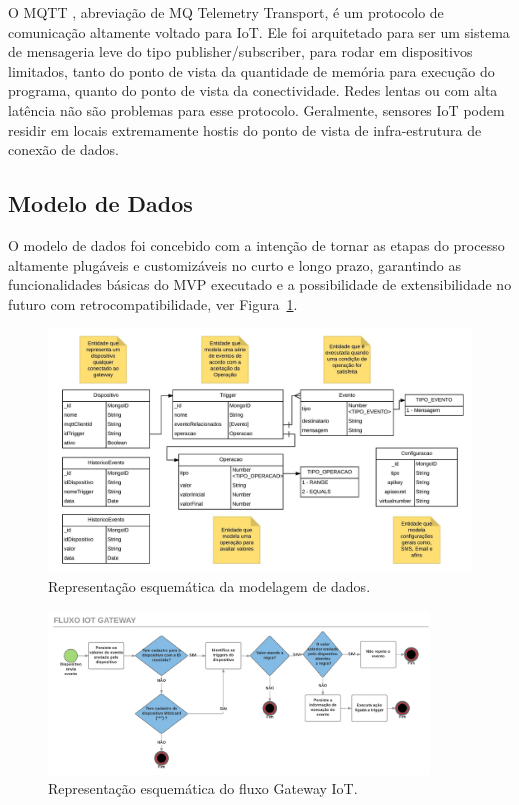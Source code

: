 O MQTT \cite{Mqtt}, abreviação de MQ Telemetry Transport, é um protocolo de comunicação altamente voltado para IoT. Ele foi arquitetado para ser um sistema de mensageria leve do tipo publisher/subscriber, para rodar em dispositivos limitados, tanto do ponto de vista da quantidade de memória para execução do programa, quanto do ponto de vista da conectividade. Redes lentas ou com alta latência não são problemas para esse protocolo. Geralmente, sensores IoT podem residir em locais extremamente hostis do ponto de vista de infra-estrutura de conexão de dados.

\subsection{Modelo de Dados}
O modelo de dados foi concebido com a intenção de tornar as etapas do processo altamente plugáveis e customizáveis no curto e longo prazo, garantindo as funcionalidades básicas do MVP executado e a possibilidade de extensibilidade no futuro com retrocompatibilidade, ver Figura~\ref{fig:modeloDeDados}.

\begin{figure}[h!]
	\begin{center}
		\includegraphics[width=1.085\textwidth]{./img/modelo-de-dados}
		\caption{Representação esquemática da modelagem de dados.}
		\label{fig:modeloDeDados}
	\end{center}
\end{figure}

\begin{figure}[h!]
		\begin{center}
		\includegraphics[width=0.9\textwidth]{./img/fluxograma}
		\caption{Representação esquemática do fluxo Gateway IoT.}
		\label{fig:fluxograma}
	\end{center}
\end{figure}

